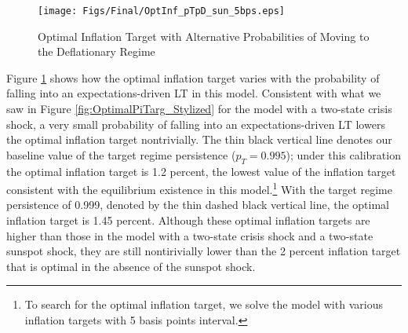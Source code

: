 \documentclass[11pt]{article}
\begin{document}
    \begin{figure}[!h]
		\begin{center}
			\caption{Optimal Inflation Target with Alternative Probabilities of Moving to the Deflationary Regime\label{fig:OptimalPiTarg_sun}}
			\texttt{[image: Figs/Final/OptInf\_pTpD\_sun\_5bps.eps]}\\
		\end{center}
	\end{figure}
    
    Figure \ref{fig:OptimalPiTarg_sun} shows how the optimal inflation target varies with the probability of falling into an expectations-driven LT in this model. Consistent with what we saw in Figure \ref{fig:OptimalPiTarg_Stylized} for the model with a two-state crisis shock, a very small probability of falling into an expectations-driven LT lowers the optimal inflation target nontrivially. The thin black vertical line denotes our baseline value of the target regime persistence ($p_{T}=0.995$); under this calibration the optimal inflation target is 1.2 percent, the lowest value of the inflation target consistent with the equilibrium existence in this model.\footnote{To search for the optimal inflation target, we solve the model with various inflation targets with 5 basis points interval.} With the target regime persistence of 0.999, denoted by the thin dashed black vertical line, the optimal inflation target is 1.45 percent. Although these optimal inflation targets are higher than those in the model with a two-state crisis shock and a two-state sunspot shock, they are still nontirivially lower than the 2 percent inflation target that is optimal in the absence of the sunspot shock.
    
	
	
	
	
	
\end{document}
